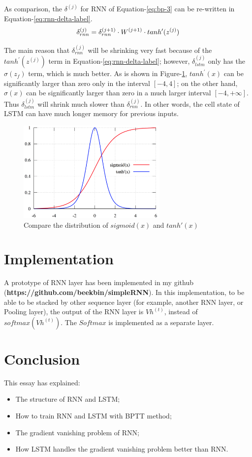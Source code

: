 \documentclass[english]{article}
\begin{document}
As comparison, the $\delta^{(j)}$ for RNN of Equation-\ref{eq:bp-3} can be re-written in Equation-\ref{eq:rnn-delta-label}.
\begin{equation}\label{eq:rnn-delta-label}
 \delta^{(j)}_{rnn} = \delta^{(j+1)}_{rnn} \cdot W^{(j+1)} \cdot tanh^{\prime}(z^{(j)})\\
\end{equation}

The main reason that $\delta^{(j)}_{rnn}$ will be shrinking very fast because of the $tanh^{\prime}(z^{(j)})$ term in Equation-\ref{eq:rnn-delta-label};
however, $\delta^{(j)}_{lstm}$ only has the $\sigma(z_f)$ term, which is much better. As is shown in Figure-\ref{fig:compare}, $tanh^{\prime}(x)$ 
can be significantly larger than zero only in the interval $[-4, 4]$; on the other hand, $\sigma(x)$  can be significantly larger than zero in a much larger
interval $[-4, +\infty]$. Thus $\delta^{(j)}_{lstm}$ will shrink much slower than $\delta^{(j)}_{rnn}$. In other words, the cell state of LSTM can have much
longer memory for previous inputs.

\begin{figure}[htbp]
	\centering
	\includegraphics[width=0.65\textwidth, keepaspectratio]{compare}
	\caption{Compare the distribution of $sigmoid(x)$ and $tanh'(x)$}
	\label{fig:compare}
\end{figure}

\section{Implementation}
A prototype of RNN layer has been implemented in my github (\textbf{https://github.com/beekbin/simpleRNN}). 
In this implementation, to be able to be stacked by other sequence layer (for example, another RNN layer, or Pooling layer), the output of the RNN
layer is $Vh^{(t)}$, instead of $softmax(Vh^{(t)})$.  The $Softmax$ is implemented as a separate layer.


\section{Conclusion}
This essay has explained:
 \begin{itemize}
  \item The structure of RNN and LSTM;
  \item How to train RNN and LSTM with BPTT method;
  \item The gradient vanishing problem of RNN;
  \item How LSTM handles the gradient vanishing problem better than RNN.
 \end{itemize}

%
%
\end{document}
